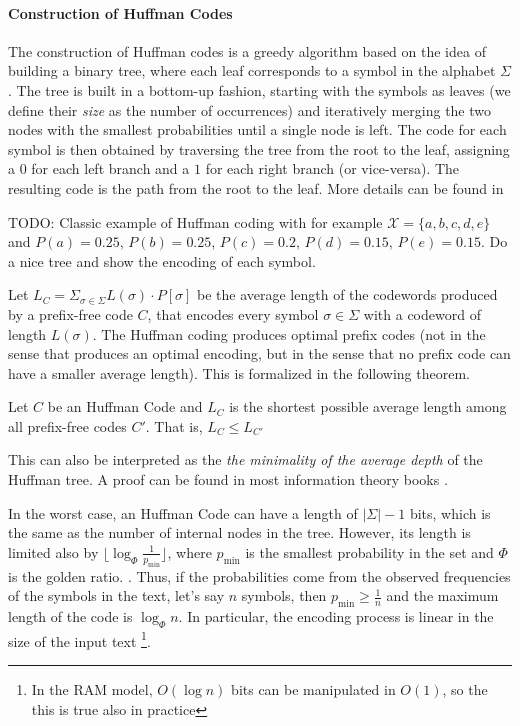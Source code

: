 \paragraph*{Construction of Huffman Codes} The construction of Huffman codes is a greedy algorithm based on the idea of building a binary tree, where each leaf corresponds to a symbol in the alphabet $\Sigma$. The tree is built in a bottom-up fashion, starting with the symbols as leaves (we define their \emph{size} as the number of occurrences) and iteratively merging the two nodes with the smallest probabilities until a single node is left. The code for each symbol is then obtained by traversing the tree from the root to the leaf, assigning a $0$ for each left branch and a $1$ for each right branch (or vice-versa). The resulting code is the path from the root to the leaf. More details can be found in \cite{ferragina2023pearls,sayood2002lossless,han2002mathematics,ElementsofInformationTheory}

\begin{example}
    TODO: Classic example of Huffman coding with for example $\mathcal{X} = \{a,b,c,d,e\}$ and $P(a)= 0.25$, $P(b)=0.25$, $P(c)=0.2$, $P(d)=0.15$, $P(e)=0.15$. Do a nice tree and show the encoding of each symbol.
\end{example}

\noindent Let $L_C = \Sigma_{\sigma \in \Sigma} L(\sigma) \cdot P[\sigma]$ be the average length of the codewords produced by a prefix-free code $C$, that encodes every symbol $\sigma \in \Sigma$ with a codeword of length $L(\sigma)$. The Huffman coding produces optimal prefix codes (not in the sense that produces an optimal encoding, but in the sense that no prefix code can have a smaller average length). This is formalized in the following theorem.

\begin{theorem} \label{thm:huffman_optimality}
    Let $C$ be an Huffman Code and $L_C$ is the shortest possible average length among all prefix-free codes $C'$. That is, $L_C \leq L_{C'}$
\end{theorem}

\noindent This can also be interpreted as the \emph{the minimality of the average depth} of the Huffman tree. A proof can be found in most information theory books \cite{ferragina2023pearls,sayood2002lossless,han2002mathematics,ElementsofInformationTheory}. \vspace{0.4cm}

\noindent In the worst case, an Huffman Code can have a length of $|\Sigma|-1$ bits, which is the same as the number of internal nodes in the tree. However, its length is limited also by $\lfloor \log_\varPhi \frac{1}{p_{\min}} \rfloor$, where $p_{\min}$ is the smallest probability in the set and $\varPhi$ is the golden ratio. \cite{navarro2016compact}. Thus, if the probabilities come from the observed frequencies of the symbols in the text, let's say $n$ symbols, then $p_{\min} \geq \frac{1}{n}$ and the maximum length of the code is $\log_\varPhi n $. In particular, the encoding process is linear in the size of the input text \footnote{In the RAM model, $O(\log n)$ bits can be manipulated in $O(1)$, so the this is true also in practice}.

